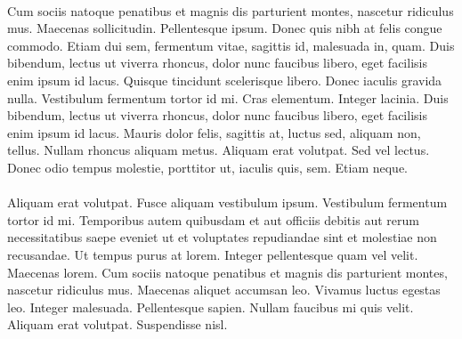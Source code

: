 \documentclass[12pt, a4paper]{article}
\begin{document}
	\paragraph{} Cum sociis natoque penatibus et magnis dis parturient montes, nascetur ridiculus mus. Maecenas sollicitudin. Pellentesque ipsum. Donec quis nibh at felis congue commodo. Etiam dui sem, fermentum vitae, sagittis id, malesuada in, quam. Duis bibendum, lectus ut viverra rhoncus, dolor nunc faucibus libero, eget facilisis enim ipsum id lacus. Quisque tincidunt scelerisque libero. Donec iaculis gravida nulla. Vestibulum fermentum tortor id mi. Cras elementum. Integer lacinia. Duis bibendum, lectus ut viverra rhoncus, dolor nunc faucibus libero, eget facilisis enim ipsum id lacus. Mauris dolor felis, sagittis at, luctus sed, aliquam non, tellus. Nullam rhoncus aliquam metus. Aliquam erat volutpat. Sed vel lectus. Donec odio tempus molestie, porttitor ut, iaculis quis, sem. Etiam neque.
	
	\newpage
	\paragraph{} Aliquam erat volutpat. Fusce aliquam vestibulum ipsum. Vestibulum fermentum tortor id mi. Temporibus autem quibusdam et aut officiis debitis aut rerum necessitatibus saepe eveniet ut et voluptates repudiandae sint et molestiae non recusandae. Ut tempus purus at lorem. Integer pellentesque quam vel velit. Maecenas lorem. Cum sociis natoque penatibus et magnis dis parturient montes, nascetur ridiculus mus. Maecenas aliquet accumsan leo. Vivamus luctus egestas leo. Integer malesuada. Pellentesque sapien. Nullam faucibus mi quis velit. Aliquam erat volutpat. Suspendisse nisl.
\end{document}
